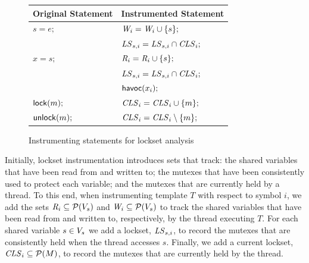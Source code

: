 \begin{figure}
\begin{tabular}{ll}
\textbf{Original Statement} & \textbf{Instrumented Statement} \\
\toprule

$s = e;$ & $\mathit{W}_{i} = \mathit{W}_{i} \cup \{ s \};$ \\
         & $\mathit{LS}_{s,i} = \mathit{LS}_{s,i} \cap \mathit{CLS}_{i};$ \\
\midrule
         
$x = s;$ & $\mathit{R}_{i} = \mathit{R}_{i} \cup \{ s \};$ \\
         & $\mathit{LS}_{s,i} = \mathit{LS}_{s,i} \cap \mathit{CLS}_{i};$ \\
         & $\mathsf{havoc}({x_{i}});$ \\
\midrule
         
$\mathsf{lock}(m);$   & $\mathit{CLS}_{i} = \mathit{CLS}_{i} \cup \{ m \};$ \\
\midrule

$\mathsf{unlock}(m);$ & $\mathit{CLS}_{i} = \mathit{CLS}_{i} \setminus \{ m \};$ \\
\bottomrule
\end{tabular}
\caption{Instrumenting statements for lockset analysis}
\label{fig:instrumentation}
\end{figure}

Initially, lockset instrumentation introduces sets that track: the shared variables that have been read from and written to; the mutexes that have been consistently used to protect each variable; and the mutexes that are currently held by a thread.  To this end, when instrumenting template $T$ with respect to symbol $i$, we add the sets $\mathit{R}_{i} \subseteq \mathcal{P}(V_s)$ and $\mathit{W}_{i} \subseteq \mathcal{P}(V_s)$ to track the shared variables that have been read from and written to, respectively, by the thread executing $T$. For each shared variable $s \in V_s$ we add a lockset, $\mathit{LS}_{s,i}$, to record the mutexes that are consistently held when the thread accesses $s$. Finally, we add a current lockset, $\mathit{CLS}_{i} \subseteq \mathcal{P}(M)$, to record the mutexes that are currently held by the thread.

